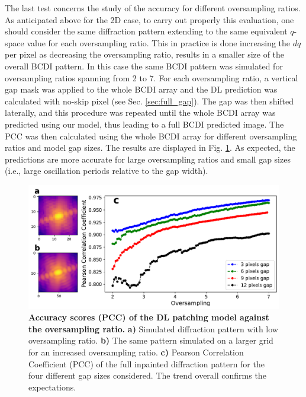 The last test concerns the study of the accuracy for different oversampling ratios. As anticipated above for the 2D case, 
to carry out properly this evaluation, one should consider the same diffraction pattern extending to the same equivalent
$q$-space value for each oversampling ratio. This in practice is done increasing the $dq$ per pixel as decreasing
the oversampling ratio, results in a smaller size of the overall BCDI pattern. In this case 
the same BCDI pattern was simulated for oversampling ratios spanning from 2 to 7. For each oversampling ratio, a vertical gap
mask was applied to the whole BCDI array and the DL prediction was calculated with no-skip pixel (see Sec. \ref{sec:full_gap}).
The gap was then shifted laterally, and this procedure was repeated until the whole BCDI array was predicted using our
model, thus leading to a full BCDI predicted image. The PCC was then calculated using the whole BCDI array for 
different oversampling ratios and model gap sizes. The results are displayed in Fig. \ref{fig:acc_ovs_3D}. As expected,
the predictions are more accurate for large oversampling ratios and small gap sizes (i.e., large oscillation periods 
relative to the gap width). 

\begin{figure}[H]
    \centering
    \includegraphics[width=\textwidth]{figures/Inpainting/accuracy_oversampling.pdf}
    \caption{\textbf{Accuracy scores (PCC) of the DL patching model against the oversampling ratio.} \textbf{a)} Simulated 
    diffraction pattern with low oversampling ratio. \textbf{b)} The same pattern simulated on a larger grid for an  
    increased oversampling ratio. \textbf{c)} Pearson Correlation Coefficient (PCC) of the full inpainted diffraction pattern 
    for the four different gap sizes considered. The trend overall confirms the expectations. }
    \label{fig:acc_ovs_3D}
\end{figure}


